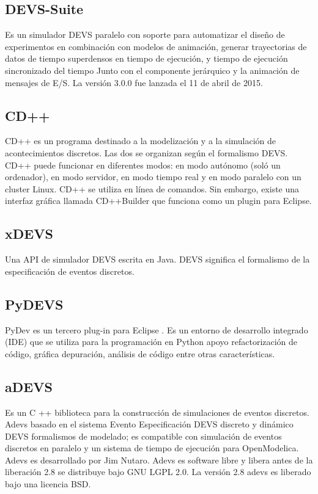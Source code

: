 \subsection{DEVS-Suite}
Es un simulador DEVS paralelo con soporte para automatizar el diseño de experimentos en combinación con modelos de animación, generar trayectorias de datos de tiempo superdensos en tiempo de ejecución, y tiempo de ejecución sincronizado del tiempo Junto con el componente jerárquico y la animación de mensajes de E/S. La versión 3.0.0 fue lanzada el 11 de abril de 2015.

\subsection{CD++}
CD++ es un programa destinado a la modelización y a la simulación de acontecimientos discretos. Las dos se organizan según el formalismo DEVS. CD++ puede funcionar en diferentes modos: en modo autónomo (soló un ordenador), en modo servidor, en modo tiempo real y en modo paralelo con un cluster Linux. CD++ se utiliza en línea de comandos. Sin embargo, existe una interfaz gráfica llamada CD++Builder que funciona como un plugin para Eclipse.

\subsection{xDEVS}
Una API de simulador DEVS escrita en Java. DEVS significa el formalismo de la especificación de eventos discretos. 

\subsection{PyDEVS}
PyDev es un tercero plug-in para Eclipse . Es un entorno de desarrollo integrado (IDE) que se utiliza para la programación en Python apoyo refactorización de código, gráfica depuración, análisis de código entre otras características.

\subsection{aDEVS}
Es un C ++ biblioteca para la construcción de simulaciones de eventos discretos. Adevs basado en el sistema Evento Especificación DEVS discreto y dinámico DEVS formalismos de modelado; es compatible con simulación de eventos discretos en paralelo y un sistema de tiempo de ejecución para OpenModelica. Adevs es desarrollado por Jim Nutaro.
Adevs es software libre y libera antes de la liberación 2.8 se distribuye bajo GNU LGPL 2.0. La versión 2.8 adevs es liberado bajo una licencia BSD.


